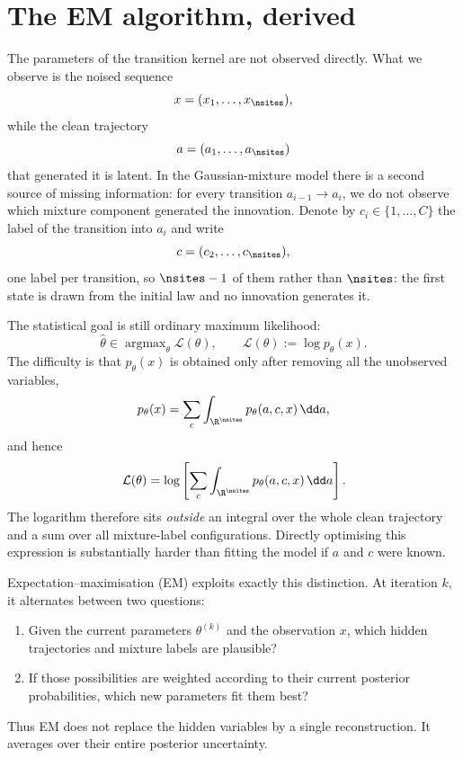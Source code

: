 \section{The EM algorithm, derived}\label{sec:em-algorithm}

The parameters of the transition kernel are not observed directly. What we
observe is the noised sequence
\[
  x=(x_1,\ldots,x_{\nsites}),
\]
while the clean trajectory
\[
  a=(a_1,\ldots,a_{\nsites})
\]
that generated it is latent. In the Gaussian-mixture model there is a second
source of missing information: for every transition
$a_{i-1}\to a_i$, we do not observe which mixture component generated the
innovation. Denote by $c_i\in\{1,\ldots,C\}$ the label of the transition into $a_i$ and
write
\[
  c=(c_2,\ldots,c_{\nsites}),
\]
one label per transition, so $\nsites-1$ of them rather than $\nsites$: the
first state is drawn from the initial law and no innovation generates it.

The statistical goal is still ordinary maximum likelihood:
\begin{equation}
  \widehat\theta
  \in
  \operatorname{argmax}_\theta \mathcal L(\theta),
  \qquad
  \mathcal L(\theta)
  :=
  \log p_\theta(x).
  \label{eq:em-objective}
\end{equation}
The difficulty is that $p_\theta(x)$ is obtained only after removing all the
unobserved variables,
\begin{equation}
  p_\theta(x)
  =
  \sum_c
  \int_{\R^{\nsites}}
  p_\theta(a,c,x)\,\dd a,
  \label{eq:em-marginalisation}
\end{equation}
and hence
\begin{equation}
  \mathcal L(\theta)
  =
  \log
  \left[
    \sum_c
    \int_{\R^{\nsites}}
    p_\theta(a,c,x)\,\dd a
  \right].
  \label{eq:em-marginal-likelihood}
\end{equation}
The logarithm therefore sits \emph{outside} an integral over the whole clean
trajectory and a sum over all mixture-label configurations. Directly
optimising this expression is substantially harder than fitting the model if
$a$ and $c$ were known.

Expectation--maximisation (EM) exploits exactly this distinction. At iteration
$k$, it alternates between two questions:
\begin{enumerate}
  \item[\emph{E-step.}]
  Given the current parameters $\theta^{(k)}$ and the observation $x$, which
  hidden trajectories and mixture labels are plausible?
  \item[\emph{M-step.}]
  If those possibilities are weighted according to their current posterior
  probabilities, which new parameters fit them best?
\end{enumerate}
Thus EM does not replace the hidden variables by a single reconstruction.
It averages over their entire posterior uncertainty.

